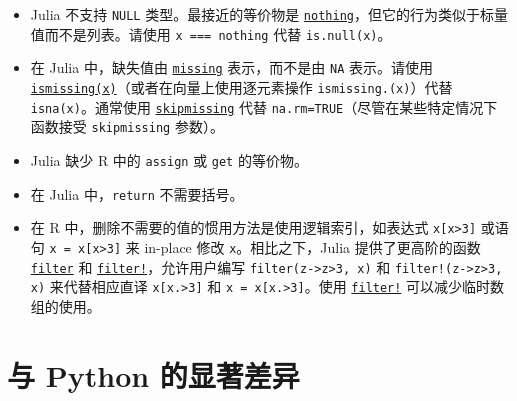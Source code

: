 \begin{itemize}
\item Julia 不支持 \texttt{NULL} 类型。最接近的等价物是 \hyperlink{9331422207248206047}{\texttt{nothing}}，但它的行为类似于标量值而不是列表。请使用 \texttt{x === nothing} 代替 \texttt{is.null(x)}。


\item 在 Julia 中，缺失值由 \hyperlink{14596725676261444434}{\texttt{missing}} 表示，而不是由 \texttt{NA} 表示。请使用 \hyperlink{3452327148507948899}{\texttt{ismissing(x)}}（或者在向量上使用逐元素操作 \texttt{ismissing.(x)}）代替 \texttt{isna(x)}。通常使用 \hyperlink{2012470681884771400}{\texttt{skipmissing}} 代替 \texttt{na.rm=TRUE}（尽管在某些特定情况下函数接受 \texttt{skipmissing} 参数）。


\item Julia 缺少 R 中的 \texttt{assign} 或 \texttt{get} 的等价物。


\item 在 Julia 中，\texttt{return} 不需要括号。


\item 在 R 中，删除不需要的值的惯用方法是使用逻辑索引，如表达式 \texttt{x[x>3]} 或语句 \texttt{x = x[x>3]} 来 in-place 修改 \texttt{x}。相比之下，Julia 提供了更高阶的函数 \hyperlink{11445961893478569145}{\texttt{filter}} 和 \hyperlink{3384092630307389071}{\texttt{filter!}}，允许用户编写 \texttt{filter(z->z>3, x)} 和 \texttt{filter!(z->z>3, x)} 来代替相应直译 \texttt{x[x.>3]} 和 \texttt{x = x[x.>3]}。使用 \hyperlink{3384092630307389071}{\texttt{filter!}} 可以减少临时数组的使用。

\end{itemize}


\hypertarget{17575785050737161441}{}


\section{与 Python 的显著差异}



